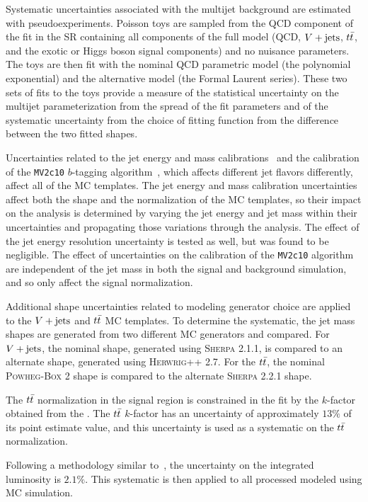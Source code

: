 Systematic uncertainties associated with the multijet background are estimated with pseudoexperiments.
Poisson toys are sampled from the QCD component of the fit in the SR containing all components of the full model (QCD, $V + \text{jets}$, $t\bar{t}$, and the exotic or Higgs boson signal components) and no nuisance parameters.
The toys are then fit with the nominal QCD parametric model (the polynomial exponential) and the alternative model (the Formal Laurent series).
These two sets of fits to the toys provide a measure of the statistical uncertainty on the multijet parameterization from the spread of the fit parameters and of the systematic uncertainty from the choice of fitting function from the difference between the two fitted shapes.

Uncertainties related to the \largeR{} jet energy and mass calibrations~\cite{JETM-2018-02} and the calibration of the \texttt{MV2c10} $b$-tagging algorithm~\cite{PERF-2016-05}, which affects different jet flavors differently, affect all of the MC templates.
The \largeR{} jet energy and mass calibration uncertainties affect both the shape and the normalization of the MC templates, so their impact on the analysis is determined by varying the jet energy and jet mass within their uncertainties and propagating those variations through the analysis.
The effect of the jet energy resolution uncertainty is tested as well, but was found to be negligible.
The effect of uncertainties on the calibration of the \texttt{MV2c10} algorithm are independent of the \largeR{} jet mass in both the signal and background simulation, and so only affect the signal normalization.

Additional shape uncertainties related to modeling generator choice are applied to the $V + \text{jets}$ and $t\bar{t}$ MC templates.
To determine the systematic, the \largeR{} jet mass shapes are generated from two different MC generators and compared.
For $V + \text{jets}$, the nominal shape, generated using \textsc{Sherpa} 2.1.1, is compared to an alternate shape, generated using \textsc{Herwrig++} 2.7.
For the $t\bar{t}$, the nominal \textsc{Powheg-Box} 2 shape is compared to the alternate \textsc{Sherpa} 2.2.1 shape.

The $t\bar{t}$ normalization in the signal region is constrained in the fit by the $k$-factor obtained from the \CRttbar{}.
The $t\bar{t}$ $k$-factor has an uncertainty of approximately $13\%$ of its point estimate value, and this uncertainty is used as a systematic on the $t\bar{t}$ normalization.

Following a methodology similar to~\cite{DAPR-2011-01}, the uncertainty on the integrated luminosity is $2.1\%$.
This systematic is then applied to all processed modeled using MC simulation.

